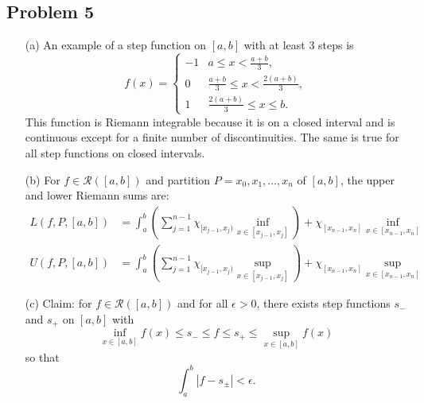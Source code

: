 \documentclass[12pt]{article}
\begin{document}
\subsection*{Problem 5}

\begin{itemize}
    \item[(a)] An example of a step function on $[a,b]$ with at least 3 steps is
    $$f(x) = \begin{cases} 
    -1 & a \leq x < \frac{a+b}{3}, \\
    0 & \frac{a+b}{3} \leq x < \frac{2(a+b)}{3}, \\
    1 & \frac{2(a+b)}{3} \leq x \leq b.
    \end{cases}$$
    This function is Riemann integrable because it is on a closed interval and is continuous except for a finite number of discontinuities. The same is true for all step functions on closed intervals.

    \item[(b)] For $f \in \mathcal{R}([a,b])$ and partition $P = x_0, x_1,...,x_n$ of $[a,b]$, the upper and lower Riemann sums are:
    \begin{align*}
        L(f,P,[a,b]) &= \int_a^b \left(\sum_{j=1}^{n-1} \chi_{[x_{j-1},x_j)} \inf_{x \in [x_{j-1}, x_j]}\right) + \chi_{[x_{n-1},x_n]} \inf_{x \in [x_{n-1}, x_n]} \\
        U(f,P,[a,b]) &= \int_a^b \left(\sum_{j=1}^{n-1} \chi_{[x_{j-1},x_j)} \sup_{x \in [x_{j-1}, x_j]}\right) + \chi_{[x_{n-1},x_n]} \sup_{x \in [x_{n-1}, x_n]}
    \end{align*}

    \item[(c)] Claim: for $f \in \mathcal{R}([a,b])$ and for all $\epsilon > 0$, there exists step functions $s_-$ and $s_+$ on $[a,b]$ with $$\inf_{x \in [a,b]} f(x) \leq s_- \leq f \leq s_+ \leq \sup_{x \in [a,b]} f(x)$$ so that $$\int_a^b |f - s_\pm| < \epsilon.$$
    

\end{itemize}
\end{document}
